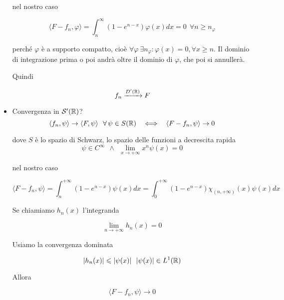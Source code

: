 \begin{itemize}
nel nostro caso

\begin{equation*}
\langle F - f_{n} ,\varphi \rangle = \int ^{\infty }_{n}\left(1 - e^{n - x}\right) \varphi (x)dx = 0\ \ \forall n\geqslant n_{\varphi }
\end{equation*}

perché $\varphi $ è a supporto compatto, cioè $\forall \varphi \ \exists n_{\varphi } :\varphi (x) = 0,\forall x\geqslant n$. Il dominio di integrazione prima o poi andrà oltre il dominio di $\varphi $, che poi si annullerà.

Quindi

\begin{equation*}
f_{n}\xrightarrow{D'(\mathbb{R})} F
\end{equation*}
\item Convergenza in $\mathcal{S}  '(\mathbb{R})$?\begin{equation*}
\langle f_{n} ,\psi \rangle \rightarrow \langle F,\psi \rangle \ \ \forall \psi \in S(\RR) \ \ \iff \ \ \langle F - f_{n} ,\psi \rangle \rightarrow 0
\end{equation*}

dove $S$ è lo spazio di Schwarz, lo spazio delle funzioni a decrescita rapida\begin{equation*}
\psi \in C^{\infty } \ \ \land \ \ \lim\limits _{x\rightarrow + \infty } x^{n} \psi (x) = 0
\end{equation*}

nel nostro caso

\begin{equation*}
\langle F - f_{n} ,\psi \rangle = \int ^{ + \infty }_{n}\left(1 - e^{n - x}\right) \psi (x) dx = \int ^{ + \infty }_{0}\left(1 - e^{n - x}\right) \chi _{(n, + \infty)}(x) \psi (x) dx
\end{equation*}

Se chiamiamo $h_{n}(x)$ l'integranda

\begin{equation*}
\lim\limits _{n\rightarrow + \infty } h_{n}(x) = 0
\end{equation*}

Usiamo la convergenza dominata

\begin{equation*}
| h_{n}(x)| \leqslant | \psi (x)| \ \ | \psi (x)| \in L^{1}(\mathbb{R})
\end{equation*}

Allora

\begin{equation*}
\langle F - f_{n} ,\psi \rangle \rightarrow 0
\end{equation*}
\end{itemize}
